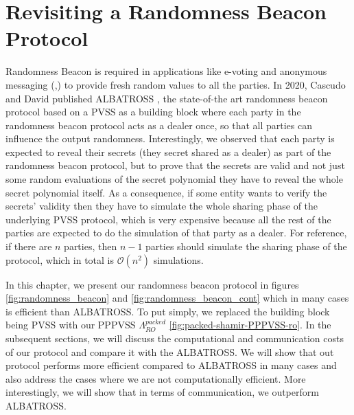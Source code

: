 \chapter{Revisiting a Randomness Beacon Protocol}
\label{cha:n}

Randomness Beacon \cite{RABIN1983256} is required in applications like e-voting \cite{10.5555/1496711.1496734} 
and anonymous messaging (\cite{180263},\cite{10.1145/2815400.2815417}) to provide fresh random values to all the 
parties. In 2020, Cascudo and David published ALBATROSS \cite{cryptoeprint:2020/644}, the state-of-the art randomness 
beacon protocol based on a PVSS as a building block where each party in the randomness beacon protocol acts as a dealer once, so that all 
parties can influence the output randomness. Interestingly, we observed that each party is expected to reveal 
their secrets (they secret shared as a dealer) as part of the randomness beacon protocol, but to prove that the 
secrets are valid and not just some random evaluations of the secret polynomial they have to reveal the whole 
secret polynomial itself. As a consequence, if some entity wants to verify the secrets' validity then they have to 
simulate the whole sharing phase of the underlying PVSS protocol, which is very expensive because all the rest of the 
parties are expected to do the simulation of that party as a dealer. For reference, if there are $n$ parties, then 
$n-1$ parties should simulate the sharing phase of the protocol, which in total is $\mathcal{O}(n^2)$ simulations.\par

In this chapter, we present our randomness beacon protocol in figures \ref{fig:randomness_beacon} and \ref{fig:randomness_beacon_cont} 
which in many cases is efficient than ALBATROSS. To put simply, we replaced the building block being PVSS with 
our PPPVSS $\Lambda_{RO}^{packed}$ \ref{fig:packed-shamir-PPPVSS-ro}. In the subsequent sections, we will discuss the 
computational and communication costs of our protocol and compare it with the ALBATROSS. We will show that out protocol 
performs more efficient compared to ALBATROSS in many cases and also address the cases where we are not computationally efficient.
More interestingly, we will show that in terms of communication, we outperform ALBATROSS.



